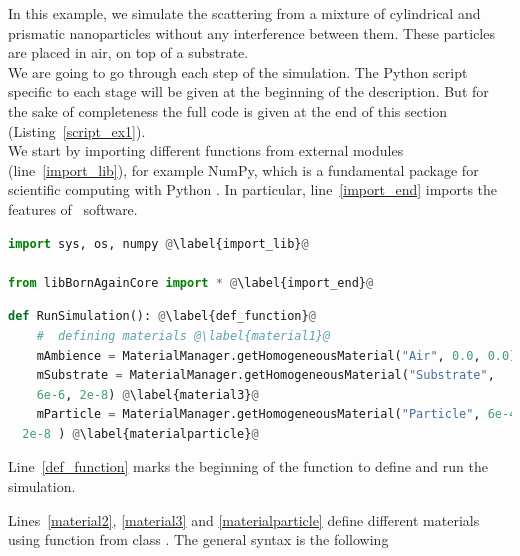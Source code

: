  

In this example, we simulate the scattering from a mixture of
cylindrical and prismatic nanoparticles without any interference
between them. These particles are placed in air, on top
of a substrate.\\ We are going to go through each step of the
simulation. The Python script specific to each stage will be given at
the beginning of the description. But for the sake of completeness the full code is given
at the end of this section (Listing~\ref{script_ex1}). \\

\noindent We start by importing different functions from external
modules (line~\ref{import_lib}), for example NumPy, which
is a fundamental package for scientific computing with Python \cite{NumPyURL}.  In particular, line~\ref{import_end}
imports the features of \BornAgain\ software.\\

\begin{lstlisting}[language=python, style=eclipseboxed,name=ex1,nolol]
import sys, os, numpy @\label{import_lib}@

from libBornAgainCore import * @\label{import_end}@
\end{lstlisting}


 

\begin{lstlisting}[language=python, style=eclipseboxed,name=ex1,nolol]
def RunSimulation(): @\label{def_function}@
    #  defining materials @\label{material1}@
    mAmbience = MaterialManager.getHomogeneousMaterial("Air", 0.0, 0.0)  @\label{material2}@
    mSubstrate = MaterialManager.getHomogeneousMaterial("Substrate",
    6e-6, 2e-8) @\label{material3}@
    mParticle = MaterialManager.getHomogeneousMaterial("Particle", 6e-4,
  2e-8 ) @\label{materialparticle}@
\end{lstlisting}

\noindent Line~\ref{def_function} marks the beginning of the
function to define and run the simulation. 

\noindent Lines~\ref{material2}, \ref{material3} and \ref{materialparticle} define different
materials using function  from class
. The general syntax is the following 

